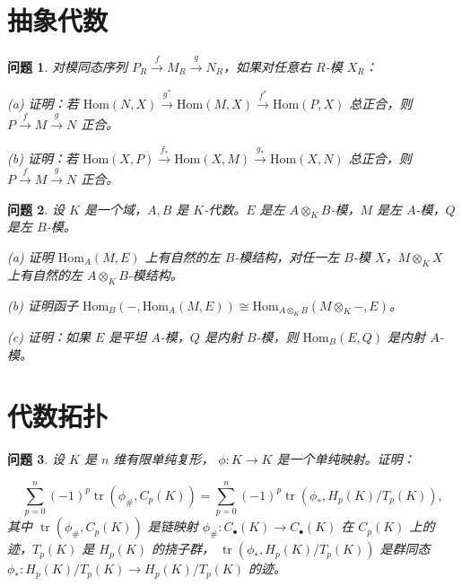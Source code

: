 \newtheorem{problem}{问题}


\section{抽象代数}

\begin{problem}
对模同态序列 \( P_R \xrightarrow{f} M_R \xrightarrow{g} N_R \)，如果对任意右 \( R \)-模 \( X_R \)：

(a) 证明：若 \(\text{Hom}(N, X) \xrightarrow{g^*} \text{Hom}(M, X) \xrightarrow{f^*} \text{Hom}(P, X)\) 总正合，则 \( P \xrightarrow{f} M \xrightarrow{g} N \) 正合。

(b) 证明：若 \(\text{Hom}(X, P) \xrightarrow{f_*} \text{Hom}(X, M) \xrightarrow{g_*} \text{Hom}(X, N)\) 总正合，则 \( P \xrightarrow{f} M \xrightarrow{g} N \) 正合。
\end{problem}

\begin{problem}
设 \( K \) 是一个域，\( A, B \) 是 \( K \)-代数。\( E \) 是左 \( A \otimes_K B \)-模，\( M \) 是左 \( A \)-模，\( Q \) 是左 \( B \)-模。

(a) 证明 \(\text{Hom}_A(M, E)\) 上有自然的左 \( B \)-模结构，对任一左 \( B \)-模 \( X \)，\( M \otimes_K X \) 上有自然的左 \( A \otimes_K B \)-模结构。

(b) 证明函子 \(\text{Hom}_B(-, \text{Hom}_A(M, E)) \cong \text{Hom}_{A \otimes_K B}(M \otimes_K -, E)\)。

(c) 证明：如果 \( E \) 是平坦 \( A \)-模，\( Q \) 是内射 \( B \)-模，则 \(\text{Hom}_B(E, Q)\) 是内射 \( A \)-模。
\end{problem}

\section{代数拓扑}

\begin{problem}
设 \( K \) 是 \( n \) 维有限单纯复形，
\( \phi : K \to K \) 是一个单纯映射。证明：

\[
\sum_{p=0}^{n} (-1)^{p} \operatorname{tr}(\phi_{\#}, C_{p}(K)) = \sum_{p=0}^{n} (-1)^{p} \operatorname{tr}(\phi_{*}, H_{p}(K)/T_{p}(K)),
\]
其中 \(\operatorname{tr}(\phi_{\#}, C_{p}(K))\) 是链映射 \(\phi_{\#} : C_{\bullet}(K) \to C_{\bullet}(K)\) 在 \(C_{p}(K)\) 上的迹，\(T_{p}(K)\) 是 \(H_{p}(K)\) 的挠子群，
\(\operatorname{tr}(\phi_{*}, H_{p}(K)/T_{p}(K))\) 是群同态 \(\phi_{*} : H_{p}(K)/T_{p}(K) \to H_{p}(K)/T_{p}(K)\) 的迹。
\end{problem}

